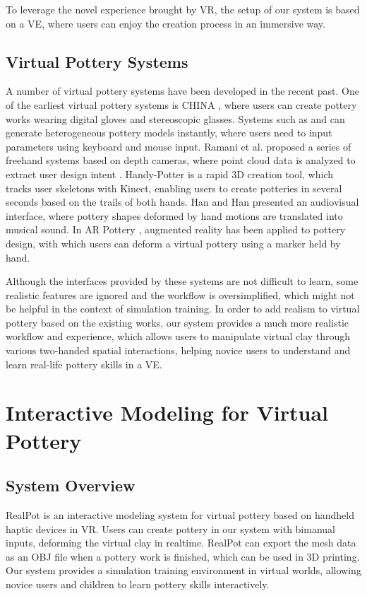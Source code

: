 \documentclass{svjour3}                     %
\begin{document}
To leverage the novel experience brought by VR, the setup of our system is based on a VE, where users can enjoy the creation process in an immersive way.

\subsection{Virtual Pottery Systems}
\label{sec:virtual}

A number of virtual pottery systems have been developed in the recent past.
One of the earliest virtual pottery systems is CHINA \cite{korida1997interactive}, where users can create pottery works wearing digital gloves and stereoscopic glasses.
Systems such as \cite{koutsoudis2009qp} and \cite{kumar2011wheel} can generate heterogeneous pottery models instantly, where users need to input parameters using keyboard and mouse input.
Ramani et al. proposed a series of freehand systems based on depth cameras, where point cloud data is analyzed to extract user design intent \cite{ramani2014zpots,ramani2015gesture,ramani2016extracting}.
Handy-Potter \cite{murugappan2013handy} is a rapid 3D creation tool, which tracks user skeletons with Kinect, enabling users to create potteries in several seconds based on the trails of both hands.
Han and Han \cite{han2014virtual} presented an audiovisual interface, where pottery shapes deformed by hand motions are translated into musical sound.
In AR Pottery \cite{han2007ar}, augmented reality has been applied to pottery design, with which users can deform a virtual pottery using a marker held by hand.

Although the interfaces provided by these systems are not difficult to learn, some realistic features are ignored and the workflow is oversimplified, which might not be helpful in the context of simulation training.
%
In order to add realism to virtual pottery based on the existing works, our system provides a much more realistic workflow and experience, which allows users to manipulate virtual clay through various two-handed spatial interactions, helping novice users to understand and learn real-life pottery skills in a VE.


\section{Interactive Modeling for Virtual Pottery}
\label{sec:interactive}


\subsection{System Overview}
\label{sec:overview}
RealPot is an interactive modeling system for virtual pottery based on handheld haptic devices in VR.
Users can create pottery in our system with bimanual inputs, deforming the virtual clay in realtime.
RealPot can export the mesh data as an OBJ file when a pottery work is finished, which can be used in 3D printing.
Our system provides a simulation training environment in virtual worlds, allowing novice users and children to learn pottery skills interactively.
\end{document}
